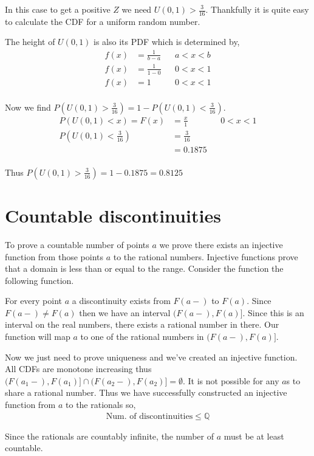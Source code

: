 \documentclass{article}
\begin{document}
In this case to get a positive $Z$ we need $U(0,1) > \frac{3}{16}$.
Thankfully it is quite easy to calculate the CDF for a uniform random number.

The height of $U(0,1)$ is also its PDF which is determined by,
\begin{align*}
    f(x) &= \frac{1}{b-a} && a < x < b \\
    f(x) &= \frac{1}{1-0} && 0 < x < 1 \\
    f(x) &= 1 && 0 < x < 1 \\
\end{align*}

Now we find $P\left(U(0,1) > \frac{3}{16}\right)
= 1 - P\left(U(0,1) < \frac{3}{16}\right)$.
\begin{align*}
    P(U(0,1) < x) = F(x) &= \frac{x}{1} && 0 < x < 1 \\
    P\left(U(0,1) < \frac{3}{16}\right) &= \frac{3}{16} \\
    &= 0.1875 \\
\end{align*}

Thus $P(U(0,1) > \frac{3}{16}) = 1 - 0.1875 = 0.8125$

\section{Countable discontinuities}
To prove a countable number of points $a$ we prove there exists an injective
function from those points $a$ to the rational numbers. Injective functions
prove that a domain is less than or equal to the range. Consider the function
the following function.

For every point $a$ a discontinuity exists from $F(a-)$ to $F(a)$. Since
$F(a-) \neq F(a)$ then we have an interval $(F(a-),F(a)]$. Since this is an
interval on the real numbers, there exists a rational number in there. Our
function will map $a$ to one of the rational numbers in $(F(a-),F(a)]$.

Now we just need to prove uniqueness and we've created an injective function.
All CDFs are monotone increasing thus
$(F(a_1-),F(a_1)] \cap (F(a_2-),F(a_2)] = \emptyset$. It is not possible for
any $a$s to share a rational number. Thus we have successfully constructed an
injective function from $a$ to the rationals so,
\begin{align*}
    \text{Num. of discontinuities} \leq \mathbb{Q}
\end{align*}

Since the rationals are countably infinite, the number of $a$ must be at least
countable.
\end{document}
